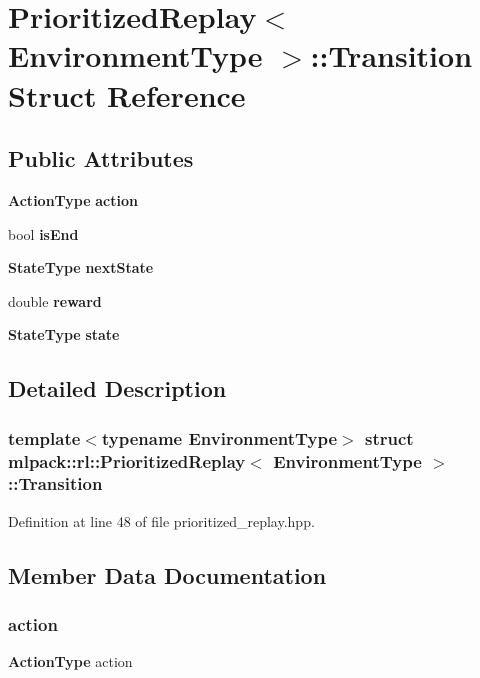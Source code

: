 \section{Prioritized\+Replay$<$ Environment\+Type $>$\+:\+:Transition Struct Reference}
\label{structmlpack_1_1rl_1_1PrioritizedReplay_1_1Transition}
\subsection*{Public Attributes}
\begin{DoxyCompactItemize}
\item 
\textbf{ Action\+Type} \textbf{ action}
\item 
bool \textbf{ is\+End}
\item 
\textbf{ State\+Type} \textbf{ next\+State}
\item 
double \textbf{ reward}
\item 
\textbf{ State\+Type} \textbf{ state}
\end{DoxyCompactItemize}


\subsection{Detailed Description}
\subsubsection*{template$<$typename Environment\+Type$>$\newline
struct mlpack\+::rl\+::\+Prioritized\+Replay$<$ Environment\+Type $>$\+::\+Transition}



Definition at line 48 of file prioritized\+\_\+replay.\+hpp.



\subsection{Member Data Documentation}
\mbox{\label{structmlpack_1_1rl_1_1PrioritizedReplay_1_1Transition_a99189868c044162e6d669fd832ecdc81}} 
\subsubsection{action}
{\footnotesize\ttfamily \textbf{ Action\+Type} action}



